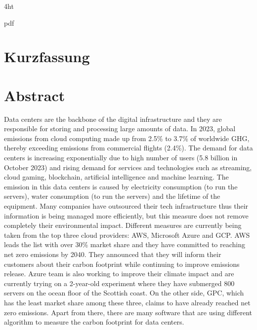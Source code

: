 \documentclass[
  a4paper,  %
  twoside,  %
  bibliography=totoc,
  headsepline,
  cleardoublepage=empty,
  parskip=half,
  draft=false
]{scrbook}
\begin{document}
\iftex4ht
  \Configure{$}{\PicMath}{\EndPicMath}{}

  {pdf}
  {%
  }
\fi



\Titelblatt

\pagestyle{preamble}
\renewcommand*{\chapterpagestyle}{preamble}



\ifdeutsch
  \section*{Kurzfassung}
\else
  \section*{Abstract}
\fi

	Data centers are the backbone of the digital infrastructure and they are responsible for storing and processing large amounts of data. In 2023, global emissions from cloud computing made up from 2.5\% to 3.7\% of worldwide GHG, thereby exceeding emissions from commercial flights (2.4\%). The demand for data centers is increasing exponentially due to high number of users (5.8 billion in October 2023) and rising demand for services and technologies such as streaming, cloud gaming, blockchain, artificial intelligence and machine learning. The emission in this data centers is caused by electricity consumption (to run the servers), water consumption (to run the servers) and the lifetime of the equipment. Many companies have outsourced their tech infrastructure thus their information is being managed more efficiently, but this measure does not remove completely their environmental impact. Different measures are currently being taken from the top three cloud providers: AWS, Microsoft Azure and GCP. AWS leads the list with over 30\% market share and they have committed to reaching net zero emissions by 2040. They announced that they will inform their customers about their carbon footprint while continuing to improve emissions release. Azure team is also working to improve their climate impact and are currently trying on a 2-year-old experiment where they have submerged 800 servers on the ocean floor of the Scottish coast. On the other side, GPC, which has the least market share among these three, claims to have already reached net zero emissions. Apart from there, there are many software that are using different algorithm to measure the carbon footprint for data centers.
\end{document}
